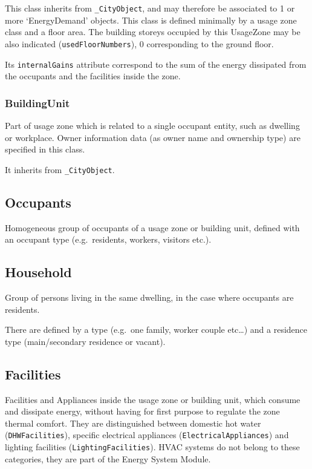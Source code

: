\documentclass[a4paper,12pt]{article}
\begin{document}
This class inherits from \texttt{\_CityObject}, and may therefore be
associated to 1 or more `EnergyDemand' objects. This class is defined
minimally by a usage zone class and a floor area. The building storeys
occupied by this UsageZone may be also indicated
(\texttt{usedFloorNumbers}), 0 corresponding to the ground floor.

Its \texttt{internalGains} attribute correspond to the sum of the energy
dissipated from the occupants and the facilities inside the zone.

\subsubsection{BuildingUnit}\label{buildingunit}

Part of usage zone which is related to a single occupant entity, such as
dwelling or workplace. Owner information data (as owner name and
ownership type) are specified in this class.

It inherits from \texttt{\_CityObject}.

\subsection{Occupants}\label{occupants}

Homogeneous group of occupants of a usage zone or building unit, defined
with an occupant type (e.g.~residents, workers, visitors etc.).

\subsection{Household}\label{household}

Group of persons living in the same dwelling, in the case where
occupants are residents.

There are defined by a type (e.g.~one family, worker couple etc\ldots{})
and a residence type (main/secondary residence or vacant).

\subsection{Facilities}\label{facilities}

Facilities and Appliances inside the usage zone or building unit, which
consume and dissipate energy, without having for first purpose to
regulate the zone thermal comfort. They are distinguished between
domestic hot water (\texttt{DHWFacilities}), specific electrical
appliances (\texttt{ElectricalAppliances}) and lighting facilities
(\texttt{LightingFacilities}). HVAC systems do not belong to these
categories, they are part of the Energy System Module.
\end{document}
